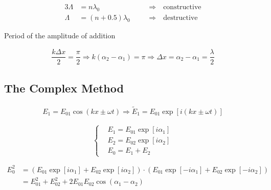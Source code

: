 \begin{alignat*}{3}
  \Lambda &= n \lambda_0 && \quad \Rightarrow \quad \text{constructive} \\
  \Lambda &= \left( n + 0.5 \right) \lambda_0 && \quad \Rightarrow \quad \text{destructive}
\end{alignat*}

Period of the amplitude of addition

\begin{equation*}
  \begin{aligned}
    \dfrac{k \Delta x}{2} = \dfrac{\pi}{2}  \Rightarrow k \left( \alpha_2 - \alpha_1 \right) = \pi \Rightarrow \Delta x = \alpha_2 - \alpha_1 = \dfrac{\lambda}{2} 
  \end{aligned}
\end{equation*}

\subsection{The Complex Method}

\begin{equation*}
  \begin{aligned}
    E_1 = E_{01} \cos \left( kx \pm \omega t \right) \Rightarrow \tilde{E}_1 = E_{01} \exp \left[ i \left( k x \pm \omega t \right) \right]
  \end{aligned}
\end{equation*}

\begin{equation*}
  \left\{
    \begin{aligned}
      & E_1 = E_{01} \exp \left[ i \alpha_1 \right] \\
      & E_2 = E_{02} \exp \left[ i \alpha_2 \right] \\
      & E_0 = E_1 + E_2
    \end{aligned}
  \right.
\end{equation*}

\begin{equation*}
  \begin{aligned}
    E_0^2 &= \left( E_{01} \exp \left[ i \alpha_1 \right] + E_{02} \exp \left[ i \alpha_2 \right] \right) \cdot \left( E_{01} \exp \left[ - i \alpha_1 \right] + E_{02} \exp \left[ - i \alpha_2 \right] \right) \\
    &= E_{01}^2 + E_{02}^2 + 2 E_{01} E_{02} \cos \left( \alpha_1 - \alpha_2 \right)
  \end{aligned}
\end{equation*}

